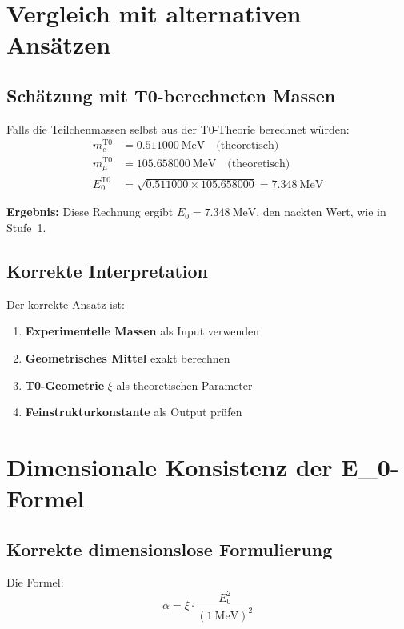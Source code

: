 	\section{Vergleich mit alternativen Ansätzen}
	
	\subsection{Schätzung mit T0-berechneten Massen}
	
	Falls die Teilchenmassen selbst aus der T0-Theorie berechnet würden:
	\begin{align}
		m_e^{\text{T0}} &= \SI{0.511000}{\MeV} \quad \text{(theoretisch)} \\
		m_\mu^{\text{T0}} &= \SI{105.658000}{\MeV} \quad \text{(theoretisch)} \\
		E_0^{\text{T0}} &= \sqrt{0.511000 \times 105.658000} = \SI{7.348}{\MeV}
	\end{align}
	
	\textbf{Ergebnis:} Diese Rechnung ergibt $E_0 = \SI{7.348}{\MeV}$, den nackten Wert, wie in Stufe~1.
	
	\subsection{Korrekte Interpretation}
	
	Der korrekte Ansatz ist:
	\begin{enumerate}
		\item \textbf{Experimentelle Massen} als Input verwenden
		\item \textbf{Geometrisches Mittel} exakt berechnen  
		\item \textbf{T0-Geometrie} $\xi$ als theoretischen Parameter
		\item \textbf{Feinstrukturkonstante} als Output prüfen
	\end{enumerate}
	
	\section{Dimensionale Konsistenz der E\_0-Formel}
	
	\subsection{Korrekte dimensionslose Formulierung}
	
	Die Formel:
	\begin{equation}
		\alpha = \xi \cdot \frac{E_0^2}{( \SI{1}{\MeV} )^2}
	\end{equation}
	
